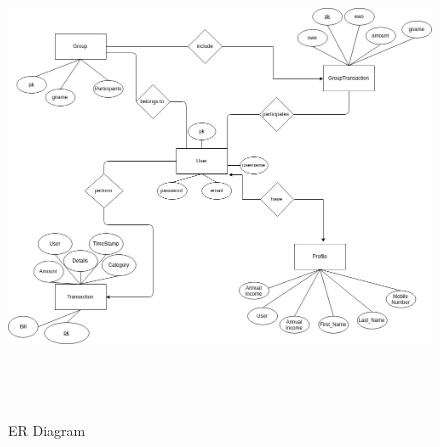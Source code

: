 \documentclass[12pt]{article}
\begin{document}
\vspace{50px}
\begin{figure}[!ht]

\centering
\includegraphics[height=5in]{ERdiagram.jpg}
\caption{ER Diagram}

\end{figure}

\pagebreak
\end{document}
